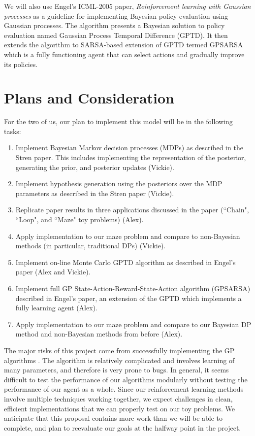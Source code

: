 \documentclass[11pt, twoside]{article}
\begin{document}
We will also use Engel's ICML-2005 paper, \textit{Reinforcement learning with Gaussian processes} as a guideline for implementing Bayesian policy evaluation using Gaussian processes. The algorithm presents a Bayesian solution to policy evaluation named Gaussian Process Temporal Difference (GPTD). It then extends the algorithm to SARSA-based extension of GPTD termed GPSARSA which is a fully functioning agent that can select actions and gradually improve its policies.

\section{Plans and Consideration}

For the two of us, our plan to implement this model will be in the following tasks:

\begin{enumerate}
\item Implement Bayesian Markov decision processes (MDPs) as described in the Stren paper. This includes implementing the representation of the posterior, generating the prior, and posterior updates (Vickie).
\item Implement hypothesis generation using the posteriors over the MDP parameters as described in the Stren paper (Vickie).
\item Replicate paper results in three applications discussed in the paper (``Chain", ``Loop", and ``Maze" toy problems) (Alex).
\item Apply implementation to our maze problem and compare to non-Bayesian methods (in particular, traditional DPs) (Vickie).
\item Implement on-line Monte Carlo GPTD algorithm as described in Engel's paper (Alex and Vickie).
\item Implement full GP State-Action-Reward-State-Action algorithm (GPSARSA) described in Engel's paper, an extension of the GPTD which implements a fully learning agent (Alex).
\item Apply implementation to our maze problem and compare to our Bayesian DP method and non-Bayesian methods from before (Alex).
\end{enumerate}


The major risks of this project come from successfully implementing the GP algorithms \cite{engel}. The algorithm is relatively complicated and involves learning of many parameters, and therefore is very prone to bugs. In general, it seems difficult to test the performance of our algorithms modularly without testing the performance of our agent as a whole. Since our reinforcement learning methods involve multiple techniques working together, we expect challenges in clean, efficient implementations that we can properly test on our toy problems. We anticipate that this proposal contains more work than we will be able to complete, and plan to reevaluate our goals at the halfway point in the project.



\end{document}
